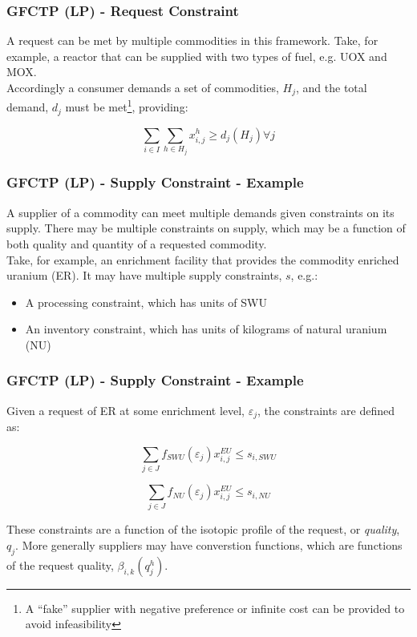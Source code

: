 \begin{frame}[ctb!]
  \frametitle{GFCTP (LP) - Request Constraint}
  
  A request can be met by multiple commodities in this framework. Take, for
  example, a reactor that can be supplied with two types of fuel, e.g. UOX and
  MOX.\\

  Accordingly a consumer demands a set of commodities, $H_j$, and the total
  demand, $d_j$ must be met\footnote{A ``fake'' supplier with negative
    preference or infinite cost can be provided to avoid infeasibility},
  providing:

  \begin{equation}
    \sum_{i \in I}\sum_{h \in H_{j}} x_{i,j}^{h} \geq d_{j}(H_{j}) \forall j
  \end{equation}
  
\end{frame}

\begin{frame}[ctb!]
  \frametitle{GFCTP (LP) - Supply Constraint - Example}
  
  A supplier of a commodity can meet multiple demands given constraints on its
  supply. There may be multiple constraints on supply, which may be a function
  of both quality and quantity of a requested commodity.\\

  Take, for example, an enrichment facility that provides the commodity enriched
  uranium (ER). It may have multiple supply constraints, $s$, e.g.:
  \begin{itemize}
    \item A processing constraint, which has units of SWU
    \item An inventory constraint, which has units of kilograms of natural
      uranium (NU)
  \end{itemize}

\end{frame}

\begin{frame}[ctb!]
  \frametitle{GFCTP (LP) - Supply Constraint - Example}
  
  Given a request of ER at some enrichment level, $\varepsilon_j$, the
  constraints are defined as:

  \begin{equation}
    \sum_{j \in J} f_{SWU}(\varepsilon_j) x_{i,j}^{EU} \leq s_{i,SWU} 
  \end{equation}

  \begin{equation}
    \sum_{j \in J} f_{NU}(\varepsilon_j) x_{i,j}^{EU} \leq s_{i,NU} 
  \end{equation}

  \pause

  These constraints are a function of the isotopic profile of the request, or
  \textit{quality}, $q_j$. More generally suppliers may have converstion
  functions, which are functions of the request quality,
  $\beta_{i,k}(q_{j}^{h})$.

\end{frame}

